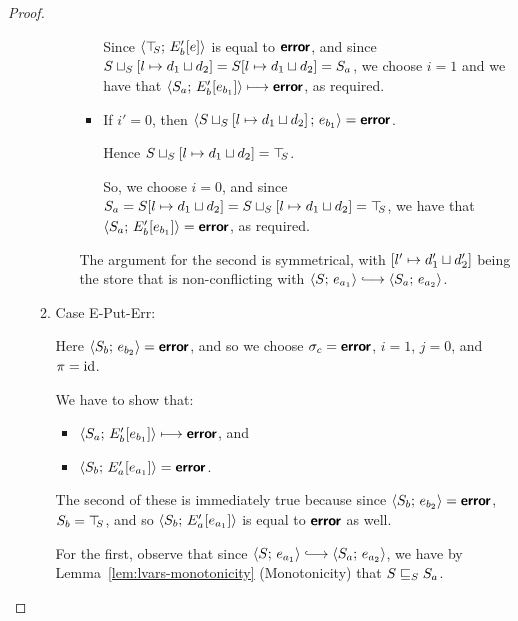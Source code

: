 \begin{proof}
\begin{enumerate}
\begin{enumerate}
\begin{itemize}
\begin{itemize}
          Since $\langle \top\hspace{-0.85mm}_{S};\, E'_b\hspace{-0.5mm}\left[e\right] \rangle$ is equal to
          $\textbf{\textsf{error}}$, and since
          $S \sqcup_{S} \left[ l \mapsto d_1 \sqcup d_2 \right]
          = S[l \mapsto d_1 \sqcup d_2] = S_a$, we choose $i =
          1$ and we have that $\langle S_a;\, E'_b\hspace{-0.5mm}\left[e_{b_1}\right] \rangle
          \longmapsto \textbf{\textsf{error}}$, as required.

        \item If $i' = 0$, then
          $\langle S \sqcup_{S} \left[ l \mapsto d_1 \sqcup d_2 \right];\, e_{b_1} \rangle
          = \textbf{\textsf{error}}$.

          Hence
          $S \sqcup_{S} \left[ l \mapsto d_1 \sqcup d_2 \right]
          = \top\hspace{-0.85mm}_{S}$.

          So, we choose $i = 0$, and since $S_a =
          S[l \mapsto d_1 \sqcup d_2] =
          S \sqcup_{S} \left[ l \mapsto d_1 \sqcup d_2 \right]
          = \top\hspace{-0.85mm}_{S}$, we have that
          $\langle S_a;\, E'_b\hspace{-0.5mm}\left[e_{b_1}\right] \rangle = \textbf{\textsf{error}}$, as
          required.
        \end{itemize}

        The argument for the second is symmetrical, with
        $\left[ l' \mapsto d'_1 \sqcup d'_2 \right]$ being the
        store that is non-conflicting with $\config{S}{e_{a_1}}
        \parstepsto \config{S_a}{e_{a_2}}$.

      \end{itemize}

    \item \label{lvars-slc-put-put-err}Case {\sc E-Put-Err}:

      Here $\langle S_b;\, e_{b_2} \rangle = \textbf{\textsf{error}}$, and so we choose $\sigma_c
      = \textbf{\textsf{error}}$, $i = 1$, $j = 0$, and $\pi = \mathrm{id}$.

      We have to show that:
      \begin{itemize}
      \item $\langle S_a;\, E'_b\hspace{-0.5mm}\left[e_{b_1}\right] \rangle \longmapsto
        \textbf{\textsf{error}}$, and
      \item $\langle S_b;\, E'_a\hspace{-0.5mm}\left[e_{a_1}\right] \rangle = \textbf{\textsf{error}}$.
      \end{itemize}

      The second of these is immediately true because since
      $\langle S_b;\, e_{b_2} \rangle = \textbf{\textsf{error}}$, $S_b = \top\hspace{-0.85mm}_{S}$, and so
      $\langle S_b;\, E'_a\hspace{-0.5mm}\left[e_{a_1}\right] \rangle$ is equal to $\textbf{\textsf{error}}$ as
      well.

      For the first, observe that since $\config{S}{e_{a_1}}
      \parstepsto \config{S_a}{e_{a_2}}$, we have by
      Lemma~\ref{lem:lvars-monotonicity} (Monotonicity) that
      $S \sqsubseteq_S S_a$.


\end{enumerate}
\end{enumerate}
\end{proof}
